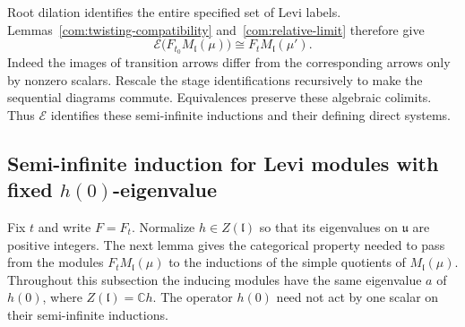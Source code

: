 \documentclass[11pt,a4paper]{amsart}
\numberwithin{equation}{section}
\theoremstyle{definition}
\theoremstyle{remark}
\newcommand{\C}{\mathbb C}
\newcommand{\uu}{\mathfrak u}
\newcommand{\lev}{\mathfrak l}
\begin{document}
Root dilation identifies the entire specified set of Levi labels.
Lemmas~\ref{com:twisting-compatibility} and~\ref{com:relative-limit}
therefore give
$$
 \mathcal E\bigl(F_{t_0}M_{\lev}(\mu)\bigr)
       \cong F_tM_{\lev}(\mu').
$$
Indeed the images of transition arrows differ from the corresponding arrows
only by nonzero scalars. Rescale the stage identifications recursively
to make the sequential diagrams commute. Equivalences preserve these
algebraic colimits. Thus $\mathcal E$ identifies these semi-infinite
inductions and their defining direct systems.

\subsection{Semi-infinite induction for Levi modules with fixed \texorpdfstring{$h(0)$}{h(0)}-eigenvalue}
Fix $t$ and write $F=F_t$. Normalize $h\in Z(\lev)$ so that
its eigenvalues on $\uu$ are positive integers.
The next lemma gives the categorical property needed to pass from
the modules $F_tM_\lev(\mu)$ to the inductions of the simple quotients
of $M_\lev(\mu)$.
Throughout this subsection the inducing modules have the same
eigenvalue $a$ of $h(0)$, where $Z(\lev)=\C h$. The operator $h(0)$
need not act by one scalar on their semi-infinite inductions.
\end{document}

